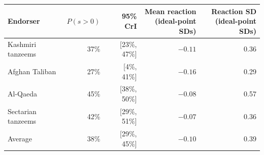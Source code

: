 \begin{tabular}{lrrrr}
\toprule
Endorser & $P(s > 0)$ & 95\% CrI & \shortstack[r]{Mean reaction\\(ideal-point SDs)} & \shortstack[r]{Reaction SD\\(ideal-point SDs)} \\
\midrule
Kashmiri tanzeems & 37\% & [23\%, 47\%] & $-0.11$ & 0.36 \\
Afghan Taliban & 27\% & [4\%, 41\%] & $-0.16$ & 0.29 \\
Al-Qaeda & 45\% & [38\%, 50\%] & $-0.08$ & 0.57 \\
Sectarian tanzeems & 42\% & [29\%, 51\%] & $-0.07$ & 0.36 \\
\midrule
Average & 38\% & [29\%, 45\%] & $-0.10$ & 0.39 \\
\bottomrule
\end{tabular}
